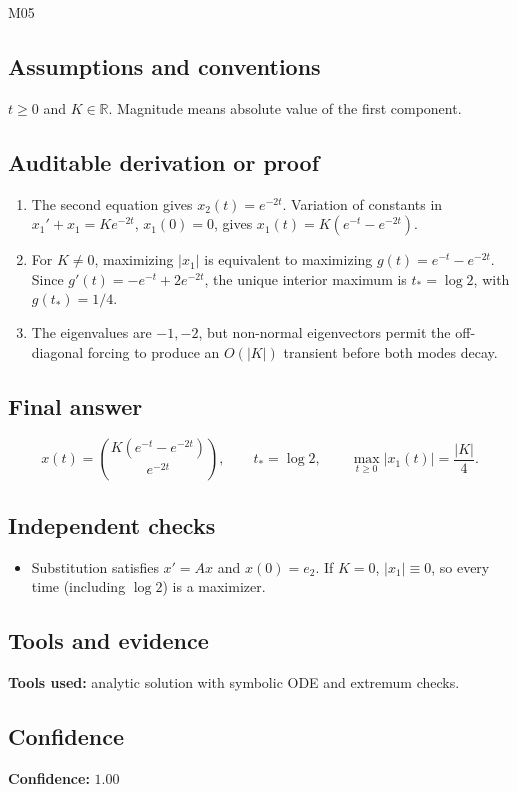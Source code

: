 \documentclass[11pt]{article}
\newcommand{\R}{\mathbb{R}}
\begin{document}

\begin{mprsolution}{M05}
\subsection*{Assumptions and conventions}
\(t\ge0\) and \(K\in\R\).  Magnitude means absolute value of the first
component.
\subsection*{Auditable derivation or proof}
\begin{enumerate}[label=\textbf{Step \arabic*:},leftmargin=*]
\item The second equation gives \(x_2(t)=e^{-2t}\).  Variation of constants in
\(x_1'+x_1=Ke^{-2t}\), \(x_1(0)=0\), gives
\(x_1(t)=K(e^{-t}-e^{-2t})\).
\item For \(K\ne0\), maximizing \(|x_1|\) is equivalent to maximizing
\(g(t)=e^{-t}-e^{-2t}\).  Since \(g'(t)=-e^{-t}+2e^{-2t}\), the unique interior
maximum is \(t_*=\log2\), with \(g(t_*)=1/4\).
\item The eigenvalues are \(-1,-2\), but non-normal eigenvectors permit the
off-diagonal forcing to produce an \(O(|K|)\) transient before both modes decay.
\end{enumerate}
\subsection*{Final answer}
\[
\boxed{x(t)=\binom{K(e^{-t}-e^{-2t})}{e^{-2t}},\qquad
t_*=\log2,\qquad \max_{t\ge0}|x_1(t)|=\frac{|K|}{4}.}
\]
\subsection*{Independent checks}
\begin{itemize}[leftmargin=*]
\item Substitution satisfies \(x'=Ax\) and \(x(0)=e_2\).  If \(K=0\),
\(|x_1|\equiv0\), so every time (including \(\log2\)) is a maximizer.
\end{itemize}
\subsection*{Tools and evidence}
\textbf{Tools used:} analytic solution with symbolic ODE and extremum checks.
\subsection*{Confidence}
\textbf{Confidence:} \(1.00\)
\end{mprsolution}
\end{document}

